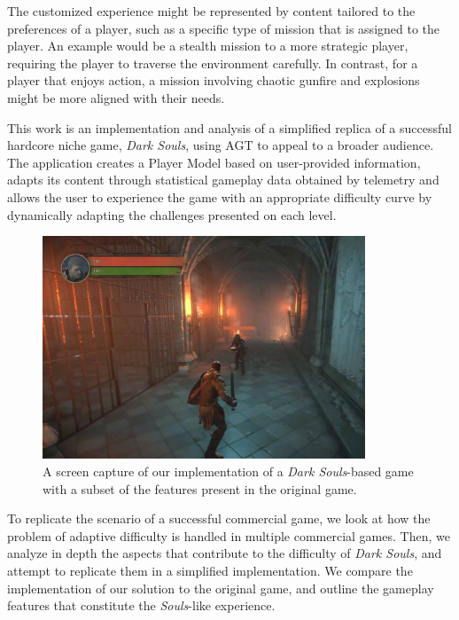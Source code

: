 \documentclass[cic,tc,english]{iiufrgs}
\begin{document}
The customized experience might be represented by content tailored to the preferences of a player, such as a specific type of mission that is assigned to the player. An example would be a stealth mission to a more strategic player, requiring the player to traverse the environment carefully. In contrast, for a player that enjoys action, a mission involving chaotic gunfire and explosions might be more aligned with their needs.

This work is an implementation and analysis of a simplified replica of a successful hardcore niche game, \emph{Dark Souls}, using AGT to appeal to a broader audience. The application creates a Player Model based on user-provided information, adapts its content through statistical gameplay data obtained by telemetry and allows the user to experience the game with an appropriate difficulty curve by dynamically adapting the challenges presented on each level.

\begin{figure}[!h]
    \caption{A screen capture of our implementation of a \emph{Dark Souls}-based game with a subset of the features present in the original game.}
    \begin{center}
        \includegraphics[width=26em]{figures/fig-bright-souls.jpg}
    \end{center}
    \label{fig:ex1}
\end{figure}

To replicate the scenario of a successful commercial game, we look at how the problem of adaptive difficulty  is handled in multiple commercial games. Then, we analyze in depth the aspects that contribute to the difficulty of \emph{Dark Souls}, and attempt to replicate them in a simplified implementation. We compare the implementation of our solution to the original game, and outline the gameplay features that constitute the \emph{Souls}-like experience.
\end{document}
